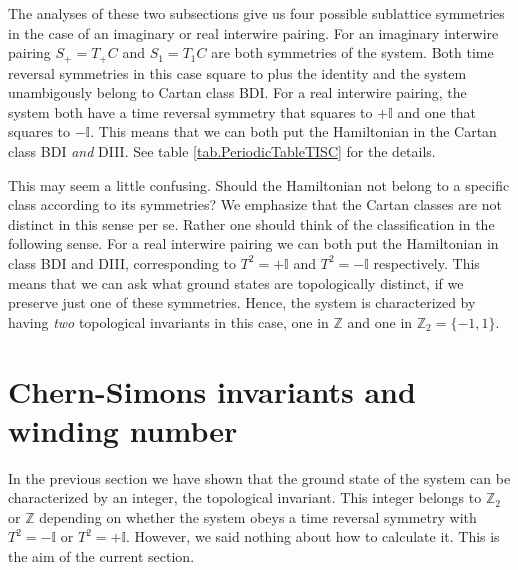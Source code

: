 The analyses of these two subsections give us four possible sublattice symmetries in the case of an imaginary or real interwire pairing. For an imaginary interwire pairing $S_+ = T_+C$ and $S_1 = T_1C$ are both symmetries of the system. Both time reversal symmetries in this case square to plus the identity and the system unambigously belong to Cartan class BDI. For a real interwire pairing, the system both have a time reversal symmetry that squares to $+ \mathbb{I}$ and one that squares to $-\mathbb{I}$. This means that we can both put the Hamiltonian in the Cartan class BDI \textit{and} DIII. See table \ref{tab.PeriodicTableTISC} for the details. 

This may seem a little confusing. Should the Hamiltonian not belong to a specific class according to its symmetries? We emphasize that the Cartan classes are not distinct in this sense per se. Rather one should think of the classification in the following sense. For a real interwire pairing we can both put the Hamiltonian in class BDI and DIII, corresponding to $T^2 = +\mathbb{I}$ and $T^2=-\mathbb{I}$ respectively. This means that we can ask what ground states are topologically distinct, if we preserve just one of these symmetries. Hence, the system is characterized by having \textit{two} topological invariants in this case, one in $\mathbb{Z}$ and one in $\mathbb{Z}_2 = \{-1, 1\}$. 

\section{Chern-Simons invariants and winding number}
\label{sec.2wires_CSinv}
In the previous section we have shown that the ground state of the system can be characterized by an integer, the topological invariant. This integer belongs to $\mathbb{Z}_2$ or $\mathbb{Z}$ depending on whether the system obeys a time reversal symmetry with $T^2 = -\mathbb{I}$ or $T^2 = + \mathbb{I}$. However, we said nothing about how to calculate it. This is the aim of the current section.

